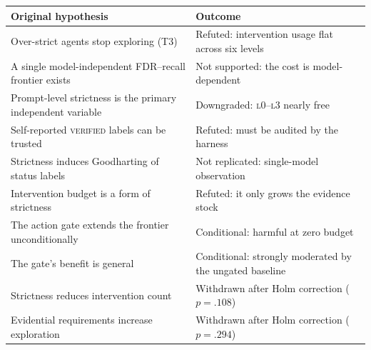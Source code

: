 \documentclass[11pt]{article}
\begin{document}
\begin{center}
\begin{tabular}{p{}p{}}
\toprule
Original hypothesis & Outcome\\
\midrule
Over-strict agents stop exploring (T3) & Refuted: intervention usage flat across six levels\\
A single model-independent FDR--recall frontier exists & Not supported: the cost is model-dependent\\
Prompt-level strictness is the primary independent variable & Downgraded: \textsc{l0}--\textsc{l3} nearly free\\
Self-reported \textsc{verified} labels can be trusted & Refuted: must be audited by the harness\\
Strictness induces Goodharting of status labels & Not replicated: single-model observation\\
Intervention budget is a form of strictness & Refuted: it only grows the evidence stock\\
The action gate extends the frontier unconditionally & Conditional: harmful at zero budget\\
The gate's benefit is general & Conditional: strongly moderated by the ungated baseline\\
Strictness reduces intervention count & Withdrawn after Holm correction ($p=.108$)\\
Evidential requirements increase exploration & Withdrawn after Holm correction ($p=.294$)\\
\bottomrule
\end{tabular}
\end{center}
\end{document}

